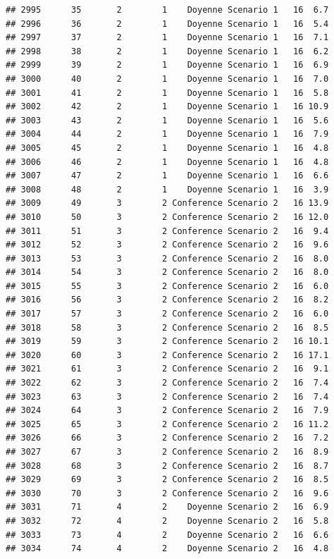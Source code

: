 \documentclass[
]{article}
\begin{document}
\begin{verbatim}
## 2995      35       2        1    Doyenne Scenario 1   16  6.7
## 2996      36       2        1    Doyenne Scenario 1   16  5.4
## 2997      37       2        1    Doyenne Scenario 1   16  7.1
## 2998      38       2        1    Doyenne Scenario 1   16  6.2
## 2999      39       2        1    Doyenne Scenario 1   16  6.9
## 3000      40       2        1    Doyenne Scenario 1   16  7.0
## 3001      41       2        1    Doyenne Scenario 1   16  5.8
## 3002      42       2        1    Doyenne Scenario 1   16 10.9
## 3003      43       2        1    Doyenne Scenario 1   16  5.6
## 3004      44       2        1    Doyenne Scenario 1   16  7.9
## 3005      45       2        1    Doyenne Scenario 1   16  4.8
## 3006      46       2        1    Doyenne Scenario 1   16  4.8
## 3007      47       2        1    Doyenne Scenario 1   16  6.6
## 3008      48       2        1    Doyenne Scenario 1   16  3.9
## 3009      49       3        2 Conference Scenario 2   16 13.9
## 3010      50       3        2 Conference Scenario 2   16 12.0
## 3011      51       3        2 Conference Scenario 2   16  9.4
## 3012      52       3        2 Conference Scenario 2   16  9.6
## 3013      53       3        2 Conference Scenario 2   16  8.0
## 3014      54       3        2 Conference Scenario 2   16  8.0
## 3015      55       3        2 Conference Scenario 2   16  6.0
## 3016      56       3        2 Conference Scenario 2   16  8.2
## 3017      57       3        2 Conference Scenario 2   16  6.0
## 3018      58       3        2 Conference Scenario 2   16  8.5
## 3019      59       3        2 Conference Scenario 2   16 10.1
## 3020      60       3        2 Conference Scenario 2   16 17.1
## 3021      61       3        2 Conference Scenario 2   16  9.1
## 3022      62       3        2 Conference Scenario 2   16  7.4
## 3023      63       3        2 Conference Scenario 2   16  7.4
## 3024      64       3        2 Conference Scenario 2   16  7.9
## 3025      65       3        2 Conference Scenario 2   16 11.2
## 3026      66       3        2 Conference Scenario 2   16  7.2
## 3027      67       3        2 Conference Scenario 2   16  8.9
## 3028      68       3        2 Conference Scenario 2   16  8.7
## 3029      69       3        2 Conference Scenario 2   16  8.5
## 3030      70       3        2 Conference Scenario 2   16  9.6
## 3031      71       4        2    Doyenne Scenario 2   16  6.9
## 3032      72       4        2    Doyenne Scenario 2   16  5.8
## 3033      73       4        2    Doyenne Scenario 2   16  6.6
## 3034      74       4        2    Doyenne Scenario 2   16  4.8

\end{verbatim}
\end{document}
